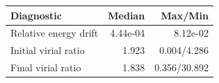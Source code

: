 \begin{tabular}{lrr}
\toprule
Diagnostic & Median & Max/Min\\
\midrule
Relative energy drift & 4.44e-04 & 8.12e-02\\
Initial virial ratio & 1.923 & 0.004/4.286\\
Final virial ratio & 1.838 & 0.356/30.892\\
\bottomrule
\end{tabular}
